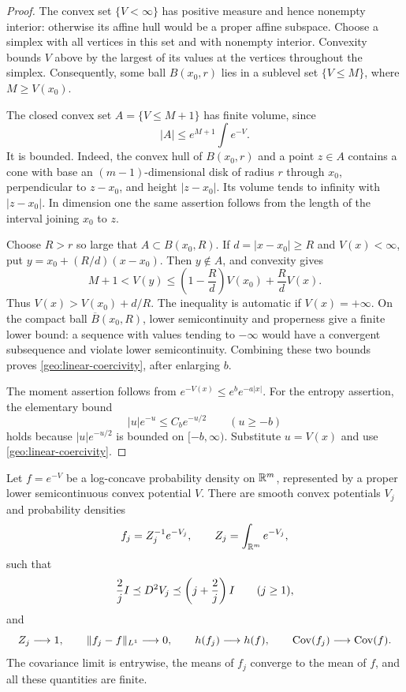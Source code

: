 \begin{proof}
The convex set $\{V<\infty\}$ has positive measure and hence nonempty
interior: otherwise its affine hull would be a proper affine subspace.
Choose a simplex with all vertices in this set and with nonempty interior.
Convexity bounds $V$ above by the largest of its values at the vertices
throughout the simplex.  Consequently, some ball $B(x_0,r)$ lies in a
sublevel set $\{V\leq M\}$, where $M\geq V(x_0)$.

The closed convex set $A=\{V\leq M+1\}$ has finite volume, since
\[
  |A|\leq e^{M+1}\int e^{-V}.
\]
It is bounded.  Indeed, the convex hull of $B(x_0,r)$ and a point $z\in A$
contains a cone with base an $(m-1)$-dimensional disk of radius $r$ through
$x_0$, perpendicular to $z-x_0$, and height $|z-x_0|$.  Its volume tends to
infinity with $|z-x_0|$.  In dimension one the same assertion follows from
the length of the interval joining $x_0$ to $z$.

Choose $R>r$ so large that $A\subset B(x_0,R)$.  If
$d=|x-x_0|\geq R$ and $V(x)<\infty$, put
$y=x_0+(R/d)(x-x_0)$.  Then $y\notin A$, and convexity gives
\[
  M+1<V(y)\leq \left(1-\frac Rd\right)V(x_0)+\frac RdV(x).
\]
Thus $V(x)>V(x_0)+d/R$.  The inequality is automatic if $V(x)=+\infty$.
On the compact ball $\overline B(x_0,R)$, lower semicontinuity and properness
give a finite lower bound: a sequence with values tending to $-\infty$
would have a convergent subsequence and violate lower semicontinuity.
Combining these two bounds proves \eqref{geo:linear-coercivity}, after
enlarging $b$.

The moment assertion follows from $e^{-V(x)}\leq e^b e^{-a|x|}$.
For the entropy assertion, the elementary bound
\begin{equation}\label{geo:entropy-domination}
  |u|e^{-u}\leq C_b e^{-u/2}\qquad(u\geq-b)
\end{equation}
holds because $|u|e^{-u/2}$ is bounded on $[-b,\infty)$.
Substitute $u=V(x)$ and use \eqref{geo:linear-coercivity}.
\end{proof}

\begin{lemma}\label{geo:approximation}
Let $f=e^{-V}$ be a log-concave probability density on $\mathbb R^m$, represented
by a proper lower semicontinuous convex potential $V$.  There are smooth
convex potentials $V_j$ and probability densities
\[
  f_j=Z_j^{-1}e^{-V_j},\qquad Z_j=\int_{\mathbb R^m}e^{-V_j},
\]
such that
\begin{equation}\label{geo:hessian-bounds}
  \frac2jI\preceq D^2V_j\preceq\left(j+\frac2j\right)I
  \qquad(j\geq1),
\end{equation}
and
\begin{equation}\label{geo:approximation-limits}
  Z_j\longrightarrow1,\qquad \lVert f_j-f\rVert_{L^1}\longrightarrow0,\qquad
  h(f_j)\longrightarrow h(f),\qquad
  \operatorname{Cov}(f_j)\longrightarrow\operatorname{Cov}(f).
\end{equation}
The covariance limit is entrywise, the means of $f_j$ converge to the mean
of $f$, and all these quantities are finite.
\end{lemma}

